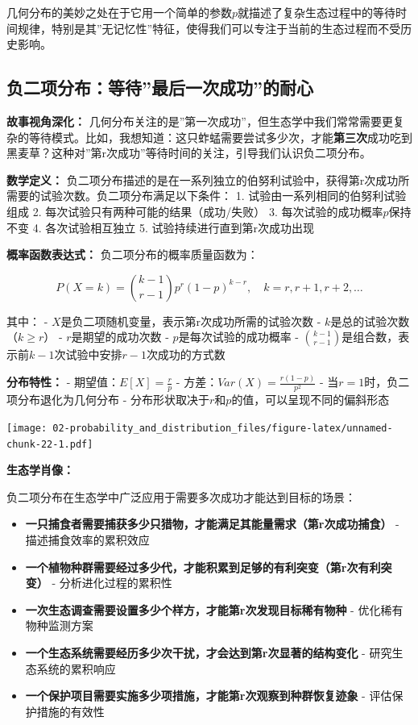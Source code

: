 \documentclass[
  twoside]{book}
\providecommand{\tightlist}{%
  \setlength{\itemsep}{0pt}\setlength{\parskip}{0pt}}
\begin{document}
几何分布的美妙之处在于它用一个简单的参数\(p\)就描述了复杂生态过程中的等待时间规律，特别是其''无记忆性''特征，使得我们可以专注于当前的生态过程而不受历史影响。

\hypertarget{ux8d1fux4e8cux9879ux5206ux5e03ux7b49ux5f85ux6700ux540eux4e00ux6b21ux6210ux529fux7684ux8010ux5fc3}{%
\subsection{负二项分布：等待''最后一次成功''的耐心}\label{ux8d1fux4e8cux9879ux5206ux5e03ux7b49ux5f85ux6700ux540eux4e00ux6b21ux6210ux529fux7684ux8010ux5fc3}}

\textbf{故事视角深化：} 几何分布关注的是''第一次成功''，但生态学中我们常常需要更复杂的等待模式。比如，我想知道：这只蚱蜢需要尝试多少次，才能\textbf{第三次}成功吃到黑麦草？这种对''第r次成功''等待时间的关注，引导我们认识负二项分布。

\textbf{数学定义：} 负二项分布描述的是在一系列独立的伯努利试验中，获得第r次成功所需要的试验次数。负二项分布满足以下条件：
1. 试验由一系列相同的伯努利试验组成
2. 每次试验只有两种可能的结果（成功/失败）
3. 每次试验的成功概率\(p\)保持不变
4. 各次试验相互独立
5. 试验持续进行直到第r次成功出现

\textbf{概率函数表达式：} 负二项分布的概率质量函数为：

\[P(X = k) = \binom{k-1}{r-1} p^r (1-p)^{k-r}, \quad k = r, r+1, r+2, \ldots\]

其中：
- \(X\)是负二项随机变量，表示第r次成功所需的试验次数
- \(k\)是总的试验次数（\(k \geq r\)）
- \(r\)是期望的成功次数
- \(p\)是每次试验的成功概率
- \(\binom{k-1}{r-1}\)是组合数，表示前\(k-1\)次试验中安排\(r-1\)次成功的方式数

\textbf{分布特性：}
- 期望值：\(E[X] = \frac{r}{p}\)
- 方差：\(Var(X) = \frac{r(1-p)}{p^2}\)
- 当\(r=1\)时，负二项分布退化为几何分布
- 分布形状取决于\(r\)和\(p\)的值，可以呈现不同的偏斜形态

\texttt{[image: 02-probability\_and\_distribution\_files/figure-latex/unnamed-chunk-22-1.pdf]}

\textbf{生态学肖像：}

负二项分布在生态学中广泛应用于需要多次成功才能达到目标的场景：

\begin{itemize}
\tightlist
\item
  \textbf{一只捕食者需要捕获多少只猎物，才能满足其能量需求（第r次成功捕食）} - 描述捕食效率的累积效应
\item
  \textbf{一个植物种群需要经过多少代，才能积累到足够的有利突变（第r次有利突变）} - 分析进化过程的累积性
\item
  \textbf{一次生态调查需要设置多少个样方，才能第r次发现目标稀有物种} - 优化稀有物种监测方案
\item
  \textbf{一个生态系统需要经历多少次干扰，才会达到第r次显著的结构变化} - 研究生态系统的累积响应
\item
  \textbf{一个保护项目需要实施多少项措施，才能第r次观察到种群恢复迹象} - 评估保护措施的有效性
\end{itemize}
\end{document}
